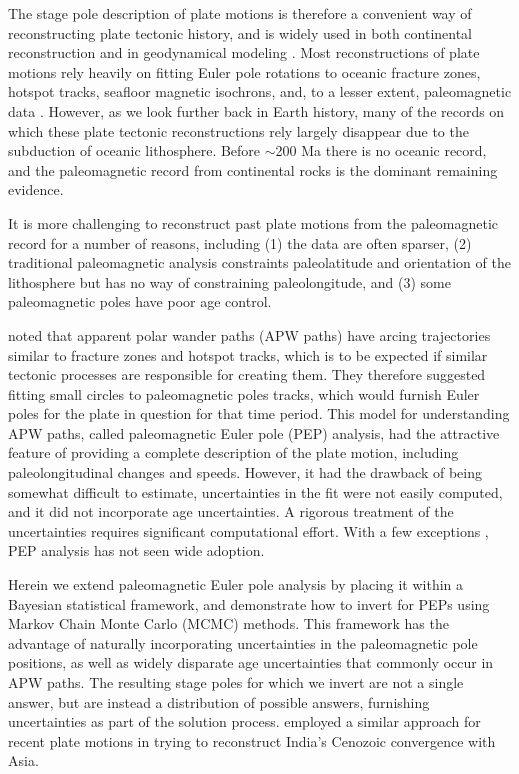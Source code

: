 \documentclass[preprint,12pt,authoryear]{elsarticle}
\begin{document}
The stage pole description of plate motions is therefore a convenient way of reconstructing
plate tectonic history, and is widely used in both continental reconstruction 
\citep[e.g.][]{boyden2011next} and in geodynamical
modeling \citep[e.g.][]{mcnamara2005thermochemical, bull2014effect, rudolph2014history}.
Most reconstructions of plate motions rely heavily on fitting Euler pole rotations
to oceanic fracture zones, hotspot tracks, seafloor magnetic isochrons,
and, to a lesser extent, paleomagnetic data \citep{muller1993revised, seton2012global}.
However, as we look further back in Earth history, many of the records on which these
plate tectonic reconstructions rely largely disappear due to the 
subduction of oceanic lithosphere. Before $\sim$200 Ma there is no oceanic record,
and the paleomagnetic record from continental rocks is the dominant remaining evidence.

It is more challenging to reconstruct past plate motions from the paleomagnetic
record for a number of reasons, including 
(1) the data are often sparser,
(2) traditional paleomagnetic analysis constraints paleolatitude and orientation
of the lithosphere but has no way of constraining paleolongitude, and
(3) some paleomagnetic poles have poor age control.

\citet{gordon1984paleomagnetic} noted that apparent polar wander paths (APW paths) have 
arcing trajectories similar to fracture zones and hotspot tracks, which is
to be expected if similar tectonic processes are responsible for creating them.
They therefore suggested fitting small circles to paleomagnetic poles tracks,
which would furnish Euler poles for the plate in question for that time period.
This model for understanding APW paths, called paleomagnetic Euler pole (PEP) analysis,
 had the attractive feature of providing a complete description of the plate motion, 
including paleolongitudinal changes and speeds. 
However, it had the drawback of being somewhat difficult to estimate,
uncertainties in the fit were not easily computed, 
and it did not incorporate age uncertainties. 
A rigorous treatment of the uncertainties requires significant computational effort.
With a few exceptions \citep[e.g.][]{beck1989paleomagnetism, tarling1996palaeomagnetic, bryan1986rotation, beck2003absolute, smirnov2010co},
PEP analysis has not seen wide adoption.

Herein we extend paleomagnetic Euler pole analysis by placing it within
a Bayesian statistical framework, and demonstrate how to invert for PEPs
using Markov Chain Monte Carlo (MCMC) methods. This framework has the advantage
of naturally incorporating uncertainties in the paleomagnetic pole positions,
as well as widely disparate age uncertainties that commonly occur in APW paths.
The resulting stage poles for which we invert are not a single answer, but are instead
a distribution of possible answers, furnishing uncertainties as part of the solution process.
\citet{iaffaldano2012reconstructing} employed a similar approach for recent 
plate motions in trying to reconstruct India's Cenozoic convergence with Asia.
\end{document}
